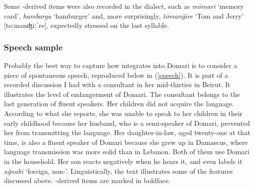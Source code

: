 \documentclass[output=paper]{langsci/langscibook}
\begin{document}
Some -derived items were also recorded in the  dialect, such as \textit{mōmari} ‘memory card’, \textit{hambarga} ‘hamburger’ and, more surprisingly, \textit{tōman\v{g}īre} ‘Tom and Jerry’ [toːmanʤiːˈre], expectedly stressed on the last syllable.


 \subsubsection{Speech sample}

Probably the best way to capture how  integrates into Domari is to consider a piece of spontaneous speech, reproduced below in (\ref{speech}). It is part of a recorded discussion I had with a consultant in her mid-thirties in Beirut. It illustrates the level of {endangerment} of  Domari. The consultant belongs to the last generation of fluent speakers. Her children did not acquire the language. According to what she reports, she was unable to speak to her children in their early childhood because her husband, who is a semi-speaker of Domari, prevented her from transmitting the language. Her daughter-in-law, aged twenty-one at that time, is also a fluent speaker of Domari because she grew up in Damascus, where language {transmission} was more solid than in Lebanon. Both of them use Domari in the household. Her son reacts negatively when he hears it, and even labels it \textit{a\v{g}nabi} ‘foreign, non-’. Linguistically, the text illustrates some of the features discussed above. -derived items are marked in boldface. 
\end{document}
